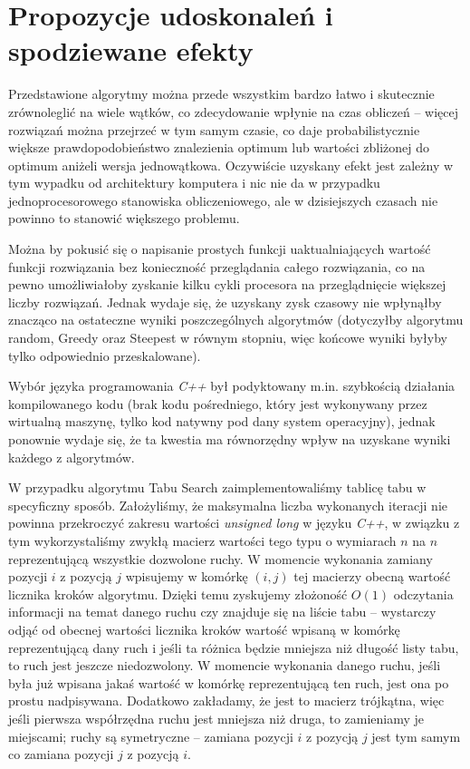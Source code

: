 \section{Propozycje udoskonaleń i spodziewane efekty}
Przedstawione algorytmy można przede wszystkim bardzo łatwo i skutecznie zrównoleglić na wiele wątków, co zdecydowanie wpłynie na czas obliczeń -- więcej rozwiązań można przejrzeć w tym samym czasie, co daje probabilistycznie większe prawdopodobieństwo znalezienia optimum lub wartości zbliżonej do optimum aniżeli wersja jednowątkowa. Oczywiście uzyskany efekt jest zależny w tym wypadku od architektury komputera i nic nie da w przypadku jednoprocesorowego stanowiska obliczeniowego, ale w dzisiejszych czasach nie powinno to stanowić większego problemu.

Można by pokusić się o napisanie prostych funkcji uaktualniających wartość funkcji rozwiązania bez konieczność przeglądania całego rozwiązania, co na pewno umożliwiałoby zyskanie kilku cykli procesora na przeglądnięcie większej liczby rozwiązań. Jednak wydaje się, że uzyskany zysk czasowy nie wpłynąłby znacząco na ostateczne wyniki poszczególnych algorytmów (dotyczyłby algorytmu random, Greedy oraz Steepest w równym stopniu, więc końcowe wyniki byłyby tylko odpowiednio przeskalowane).

Wybór języka programowania \emph{C++} był podyktowany m.in. szybkością działania kompilowanego kodu (brak kodu pośredniego, który jest wykonywany przez wirtualną maszynę, tylko kod natywny pod dany system operacyjny), jednak ponownie wydaje się, że ta kwestia ma równorzędny wpływ na uzyskane wyniki każdego z algorytmów.

W przypadku algorytmu Tabu Search zaimplementowaliśmy tablicę tabu w specyficzny sposób. Założyliśmy, że maksymalna liczba wykonanych iteracji nie powinna przekroczyć zakresu wartości \textit{unsigned long} w języku \emph{C++}, w związku z tym wykorzystaliśmy zwykłą macierz wartości tego typu o wymiarach $n$ na $n$ reprezentującą wszystkie dozwolone ruchy. W momencie wykonania zamiany pozycji $i$ z pozycją $j$ wpisujemy w komórkę $(i,j)$ tej macierzy obecną wartość licznika kroków algorytmu. Dzięki temu zyskujemy złożoność $O(1)$ odczytania informacji na temat danego ruchu czy znajduje się na liście tabu -- wystarczy odjąć od obecnej wartości licznika kroków wartość wpisaną w komórkę reprezentującą dany ruch i jeśli ta różnica będzie mniejsza niż długość listy tabu, to ruch jest jeszcze niedozwolony. W momencie wykonania danego ruchu, jeśli była już wpisana jakaś wartość w komórkę reprezentującą ten ruch, jest ona po prostu nadpisywana. Dodatkowo zakładamy, że jest to macierz trójkątna, więc jeśli pierwsza współrzędna ruchu jest mniejsza niż druga, to zamieniamy je miejscami; ruchy są symetryczne -- zamiana pozycji $i$ z pozycją $j$ jest tym samym co zamiana pozycji $j$ z pozycją $i$.

